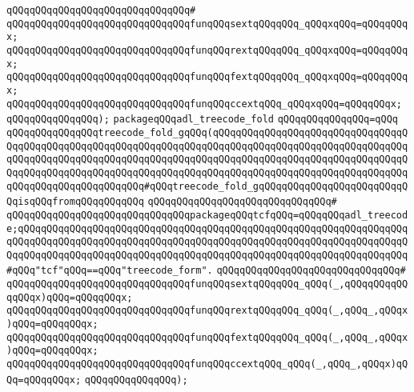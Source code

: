 \verb|qQQqqQQqqQQqqQQqqQQqqQQqqQQqqQQq#|\newline
\verb|qQQqqQQqqQQqqQQqqQQqqQQqqQQqqQQqfunqQQqsextqQQqqQQq_qQQqxqQQq=qQQqqQQqx;|\newline
\verb|qQQqqQQqqQQqqQQqqQQqqQQqqQQqqQQqfunqQQqrextqQQqqQQq_qQQqxqQQq=qQQqqQQqx;|\newline
\verb|qQQqqQQqqQQqqQQqqQQqqQQqqQQqqQQqfunqQQqfextqQQqqQQq_qQQqxqQQq=qQQqqQQqx;|\newline
\verb|qQQqqQQqqQQqqQQqqQQqqQQqqQQqqQQqfunqQQqccextqQQq_qQQqxqQQq=qQQqqQQqx;|\newline
\verb|qQQqqQQqqQQqqQQq);|\newline
\newline
\verb|packageqQQqadl_treecode_fold|\newline
\verb|qQQqqQQqqQQqqQQq=qQQq|\newline
\verb|qQQqqQQqqQQqqQQqtreecode_fold_gqQQq(qQQqqQQqqQQqqQQqqQQqqQQqqQQqqQQqqQQqqQQqqQQqqQQqqQQqqQQqqQQqqQQqqQQqqQQqqQQqqQQqqQQqqQQqqQQqqQQqqQQqqQQqqQQqqQQqqQQqqQQqqQQqqQQqqQQqqQQqqQQqqQQqqQQqqQQqqQQqqQQqqQQqqQQqqQQqqQQqqQQqqQQqqQQqqQQqqQQqqQQqqQQqqQQqqQQqqQQqqQQqqQQqqQQqqQQqqQQqqQQqqQQqqQQqqQQqqQQqqQQqqQQqqQQq#qQQqtreecode_fold_gqQQqqQQqqQQqqQQqqQQqqQQqqQQqisqQQqfromqQQqqQQqqQQq|\newline
\verb|qQQqqQQqqQQqqQQqqQQqqQQqqQQqqQQq#|\newline
\verb|qQQqqQQqqQQqqQQqqQQqqQQqqQQqqQQqpackageqQQqtcfqQQq=qQQqqQQqadl_treecode;qQQqqQQqqQQqqQQqqQQqqQQqqQQqqQQqqQQqqQQqqQQqqQQqqQQqqQQqqQQqqQQqqQQqqQQqqQQqqQQqqQQqqQQqqQQqqQQqqQQqqQQqqQQqqQQqqQQqqQQqqQQqqQQqqQQqqQQqqQQqqQQqqQQqqQQqqQQqqQQqqQQqqQQqqQQqqQQqqQQqqQQqqQQqqQQqqQQqqQQqqQQqqQQq#qQQq"tcf"qQQq==qQQq"treecode_form".|\newline
\verb|qQQqqQQqqQQqqQQqqQQqqQQqqQQqqQQq#|\newline
\verb|qQQqqQQqqQQqqQQqqQQqqQQqqQQqqQQqfunqQQqsextqQQqqQQq_qQQq(_,qQQqqQQqqQQqqQQqx)qQQq=qQQqqQQqx;|\newline
\verb|qQQqqQQqqQQqqQQqqQQqqQQqqQQqqQQqfunqQQqrextqQQqqQQq_qQQq(_,qQQq_,qQQqx)qQQq=qQQqqQQqx;|\newline
\verb|qQQqqQQqqQQqqQQqqQQqqQQqqQQqqQQqfunqQQqfextqQQqqQQq_qQQq(_,qQQq_,qQQqx)qQQq=qQQqqQQqx;|\newline
\verb|qQQqqQQqqQQqqQQqqQQqqQQqqQQqqQQqfunqQQqccextqQQq_qQQq(_,qQQq_,qQQqx)qQQq=qQQqqQQqx;|\newline
\verb|qQQqqQQqqQQqqQQq);|\newline
